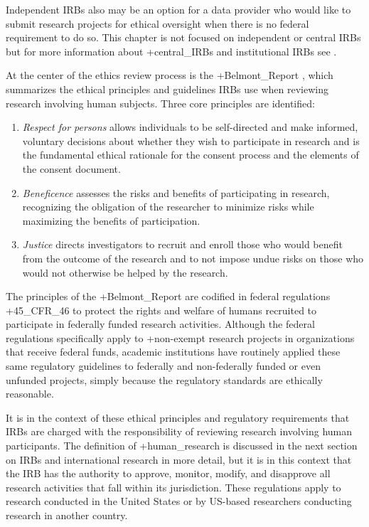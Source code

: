 \documentclass[
]{book}
\providecommand{\tightlist}{%
  \setlength{\itemsep}{0pt}\setlength{\parskip}{0pt}}
\begin{document}
Independent IRBs also may be an option for a data provider who would like to submit research projects for ethical oversight when there is no federal requirement to do so. This chapter is not focused on independent or central IRBs but for more information about +central\_IRBs\textbar{} and institutional IRBs see \citet{wandile2018}.

At the center of the ethics review process is the +Belmont\_Report\textbar{} \citep{unitedstates1978}, which summarizes the ethical principles and guidelines IRBs use when reviewing research involving human subjects. Three core principles are identified:

\begin{enumerate}
\def\labelenumi{\arabic{enumi}.}
\tightlist
\item
  \emph{Respect for persons} allows individuals to be self-directed and make informed, voluntary decisions about whether they wish to participate in research and is the fundamental ethical rationale for the consent process and the elements of the consent document.
\item
  \emph{Beneficence} assesses the risks and benefits of participating in research, recognizing the obligation of the researcher to minimize risks while maximizing the benefits of participation.
\item
  \emph{Justice} directs investigators to recruit and enroll those who would benefit from the outcome of the research and to not impose undue risks on those who would not otherwise be helped by the research.
\end{enumerate}

The principles of the +Belmont\_Report\textbar{} are codified in federal regulations +45\_CFR\_46\textbar{} to protect the rights and welfare of humans recruited to participate in federally funded research activities. Although the federal regulations specifically apply to +non-exempt\textbar{} research projects in organizations that receive federal funds, academic institutions have routinely applied these same regulatory guidelines to federally and non-federally funded or even unfunded projects, simply because the regulatory standards are ethically reasonable.

It is in the context of these ethical principles and regulatory requirements that IRBs are charged with the responsibility of reviewing research involving human participants. The definition of +human\_research\textbar{} is discussed in the next section on IRBs and international research in more detail, but it is in this context that the IRB has the authority to approve, monitor, modify, and disapprove all research activities that fall within its jurisdiction. These regulations apply to research conducted in the United States or by US-based researchers conducting research in another country.
\end{document}
